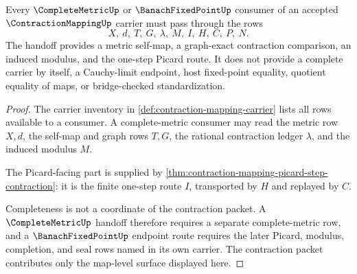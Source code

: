 \begin{theorem}
\label{thm:contraction-mapping-complete-metric-handoff}
Every $\CompleteMetricUp$ or $\BanachFixedPointUp$ consumer of an accepted $\ContractionMappingUp$ carrier must pass through the rows
$$
X,\ d,\ T,\ G,\ \lambda,\ M,\ I,\ H,\ C,\ P,\ N.
$$
The handoff provides a metric self-map, a graph-exact contraction comparison, an induced modulus, and the one-step Picard route. It does not provide a complete carrier by itself, a Cauchy-limit endpoint, host fixed-point equality, quotient equality of maps, or bridge-checked standardization.
\end{theorem}
\begin{proof}
The carrier inventory in \autoref{def:contraction-mapping-carrier} lists all rows available to a consumer. A complete-metric consumer may read the metric row $X,d$, the self-map and graph rows $T,G$, the rational contraction ledger $\lambda$, and the induced modulus $M$.

The Picard-facing part is supplied by \autoref{thm:contraction-mapping-picard-step-contraction}: it is the finite one-step route $I$, transported by $H$ and replayed by $C$.

Completeness is not a coordinate of the contraction packet. A $\CompleteMetricUp$ handoff therefore requires a separate complete-metric row, and a $\BanachFixedPointUp$ endpoint route requires the later Picard, modulus, completion, and seal rows named in its own carrier. The contraction packet contributes only the map-level surface displayed here.
\end{proof}

